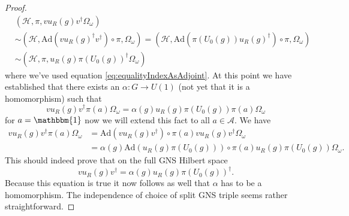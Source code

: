 \documentclass[12pt,a4paper,twoside]{article}
\newcommand{\HH}{\mathcal H}
\renewcommand{\AA}{\mathcal A}
\newcommand{\one}{\mathbbm{1}}
\newcommand{\Ad}{\textrm{Ad}}
\theoremstyle{definition}
\newtheorem{lemma}[theorem]{Lemma}
\numberwithin{equation}{section}
\begin{document}
\begin{proof}
	 \begin{align}
	 	&(\HH,\pi,v u_R(g)v^\dagger \Omega_\omega)\\
	 	&\sim (\HH,\Ad(v u_R(g)^\dagger v^\dagger)\circ\pi,\Omega_\omega)=(\HH,\Ad(\pi(U_0(g))u_R(g)^\dagger)\circ\pi,\Omega_\omega)\\
	 	&\sim (\HH,\pi,u_R(g)\pi(U_0(g))^\dagger \Omega_\omega)
	 \end{align}
 	where we've used equation \eqref{eq:equalityIndexAsAdjoint}. At this point we have established that there exists an $\alpha:G\rightarrow U(1)$ (not yet that it is a homomorphism) such that
 	\begin{equation}
 		v u_R(g) v^\dagger \pi(a) \Omega_\omega =\alpha(g) u_R(g) \pi(U_0(g))\pi(a) \Omega_\omega
 	\end{equation}
 	for $a=\one$ now we will extend this fact to all $a\in\AA$. We have
 	\begin{align}
 		v u_R(g) v^\dagger \pi(a) \Omega_\omega&=\Ad(v u_R(g) v^\dagger)\circ \pi(a) v u_R(g) v^\dagger \Omega_\omega\\
 		&=\alpha(g) \Ad(u_R(g) \pi(U_0(g)))\circ \pi(a) u_R(g) \pi(U_0(g)) \Omega_\omega.
 	\end{align}
 	This should indeed prove that on the full GNS Hilbert space
 	\begin{equation}
 		v u_R(g)v^\dagger =\alpha(g) u_R(g)\pi(U_0(g))^\dagger.
 	\end{equation}
 	Because this equation is true it now follows as well that $\alpha$ has to be a homomorphism. The independence of choice of split GNS triple seems rather straightforward.
\end{proof}
{}

\end{document}
